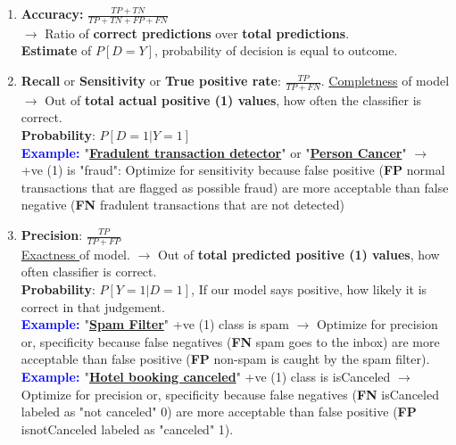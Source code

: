 \documentclass[letterpaper, 10.5pt,landscape]{article}
\begin{document}
\begin{multicols*}{3}
\begin{enumerate}
    \item \textbf{Accuracy: } $\boxed{\frac{TP + TN}{TP + TN + FP + FN}}$ \\
    $\rightarrow$ Ratio of \textbf{correct predictions} over \textbf{total predictions}. \\
    \textbf{Estimate} of $\boxed{P[D=Y]}$,  probability of decision is equal to outcome.
    \vspace{-3pt}
    \item \textbf{Recall} or \textbf{Sensitivity} or \textbf{True positive rate}: $\boxed{\frac{TP}{TP+FN}}$.  \underline{Completness} of model $\rightarrow$ Out of \textbf{total actual positive (1) values}, how often the classifier is correct. \\
    \textbf{Probability}: $\boxed{P[D=1 | Y=1]}$ \\
    \textbf{\textcolor{blue}{Example: }} "\underline{\textbf{Fradulent transaction detector}}" or "\underline{\textbf{Person Cancer}}" $\rightarrow$ +ve (1) is "fraud": Optimize for sensitivity because false positive (\textbf{FP} normal transactions that are flagged as possible fraud) are more acceptable than false negative (\textbf{FN} fradulent transactions that are not detected) 
    \vspace{-2pt}

    \item \textbf{Precision}: $\boxed{\frac{TP}{TP+FP}}$ \\
    \underline{Exactness } of model. $\rightarrow$ Out of \textbf{total predicted positive (1) values}, how often classifier is correct. \\ \textbf{Probability}: $\boxed{P[Y=1 | D=1]}$, If our model says positive, how likely it is correct in that judgement.\\
    \textbf{\textcolor{blue}{Example: }} "\underline{\textbf{Spam Filter}}" +ve (1) class is spam $\rightarrow$ Optimize for precision or, specificity because false negatives (\textbf{FN} spam goes to the inbox) are more acceptable than false positive (\textbf{FP} non-spam is caught by the spam filter).
    \textbf{\textcolor{blue}{Example: }} "\underline{\textbf{Hotel booking canceled}}" +ve (1) class is isCanceled $\rightarrow$ Optimize for precision or, specificity because false negatives (\textbf{FN} isCanceled labeled as "not canceled" 0) are more acceptable than false positive (\textbf{FP} isnotCanceled labeled as "canceled" 1).
    \vspace{-2pt}


\end{enumerate}
\end{multicols*}
\end{document}
